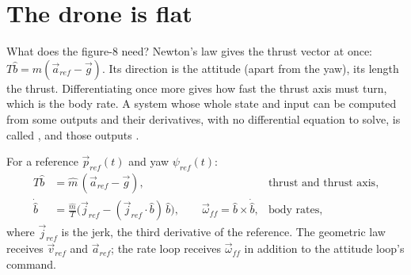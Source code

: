 \section{The drone is flat}

What does the figure-8 need? Newton's law gives the thrust vector at once: $T\hat b = m(\vec a_{ref} - \vec g)$. Its direction is the attitude (apart from the yaw), its length the thrust. Differentiating once more gives how fast the thrust axis must turn, which is the body rate. A system whose whole state and input can be computed from some outputs and their derivatives, with no differential equation to solve, is called , and those outputs .

\begin{result}
For a reference $\vec p_{ref}(t)$ and yaw $\psi_{ref}(t)$:
\begin{align}
  T\hat b &= \hat m\,(\vec a_{ref} - \vec g), &\text{thrust and thrust axis,}\label{eq:flatness-thrust}\\
  \dot{\hat b} &= \frac{\hat m}{T}\big(\vec j_{ref} - (\vec j_{ref}\cdot\hat b)\,\hat b\big), \qquad \vec\omega_{ff} = \hat b \times \dot{\hat b}, &\text{body rates,}\label{eq:flatness-rates}
\end{align}
where $\vec j_{ref}$ is the jerk, the third derivative of the reference. The geometric law receives $\vec v_{ref}$ and $\vec a_{ref}$; the rate loop receives $\vec\omega_{ff}$ in addition to the attitude loop's command.
\end{result}

